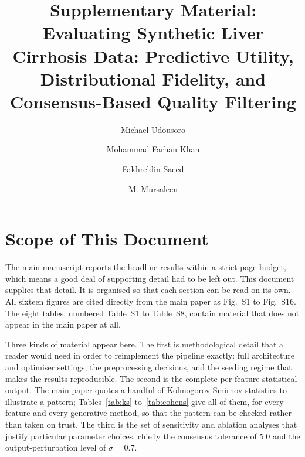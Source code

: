\documentclass[manuscript,review,screen,nonacm]{acmart}
\newif\ifshowrevisions
\DeclareRobustCommand{\rev}[1]{\ifshowrevisions{\color{revisionblue}#1}\else#1\fi}
\begin{document}
\title[Synthetic Liver Cirrhosis Data: Utility and Quality]{\rev{Supplementary Material: Evaluating Synthetic Liver Cirrhosis Data: Predictive Utility, Distributional Fidelity, and Consensus-Based Quality Filtering}}
\author{Michael Udousoro}
\author{Mohammad Farhan Khan}
\author{Fakhreldin Saeed}
\author{M. Mursaleen}
\renewcommand{\shortauthors}{Udousoro et al.}

\maketitle
\section{Scope of This Document}

The main manuscript reports the headline results within a strict page budget, which means a good deal of supporting detail had to be left out. This document supplies that detail. It is organised so that each section can be read on its own. All sixteen figures are cited directly from the main paper as Fig.~S1 to Fig.~S16. The eight tables, numbered Table~S1 to Table~S8, contain material that does not appear in the main paper at all.

Three kinds of material appear here. The first is methodological detail that a reader would need in order to reimplement the pipeline exactly: full architecture and optimiser settings, the preprocessing decisions, and the seeding regime that makes the results reproducible. The second is the complete per-feature statistical output. The main paper quotes a handful of Kolmogorov-Smirnov statistics to illustrate a pattern; Tables~\ref{tab:ks} to~\ref{tab:cohens} give all of them, for every feature and every generative method, so that the pattern can be checked rather than taken on trust. The third is the set of sensitivity and ablation analyses that justify particular parameter choices, chiefly the consensus tolerance of 5.0 and the output-perturbation level of $\sigma = 0.7$.
\end{document}
